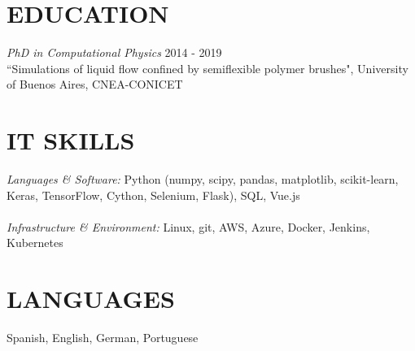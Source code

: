 \documentclass[margin]{res}
\begin{document}
\begin{resume}

\section{EDUCATION} {\sl PhD in Computational Physics}  \hfill 2014 - 2019 \\
                ``Simulations of liquid flow confined by semiflexible 
		polymer brushes", University of Buenos Aires, CNEA-CONICET  \\

 
    \section{IT SKILLS} {\sl Languages \& Software:} Python (numpy, scipy, pandas, matplotlib, scikit-learn, Keras, TensorFlow, Cython, Selenium, Flask), SQL, Vue.js \\ \\ 
    {\sl Infrastructure \& Environment:} Linux, git, AWS, Azure, Docker, Jenkins, Kubernetes \\
               
 
\section{LANGUAGES}  Spanish, English, German, Portuguese 

 

\end{resume}
\end{document}
